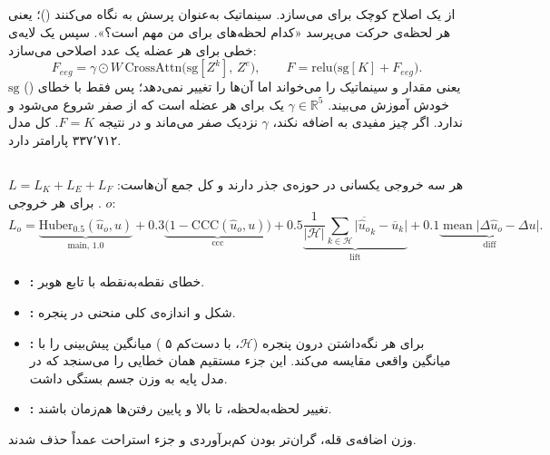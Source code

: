 \subsection{}

 از  یک اصلاح کوچک برای  می‌سازد.  سینماتیک به‌عنوان پرسش به   نگاه می‌کنند ()؛ یعنی هر لحظه‌ی حرکت می‌پرسد «کدام لحظه‌های  برای من مهم است؟». سپس یک لایه‌ی خطی برای هر عضله یک عدد اصلاحی می‌سازد:
\begin{equation}
F_{eeg}=\gamma\odot W\,\mathrm{CrossAttn}\big(\mathrm{sg}[Z^{k}],\,Z^{e}\big),\qquad F=\mathrm{relu}\big(\mathrm{sg}[K]+F_{eeg}\big).
\end{equation}
$\mathrm{sg}$ () یعنی  مقدار  و  سینماتیک را می‌خواند اما آن‌ها را تغییر نمی‌دهد؛ پس  فقط با خطای خودش آموزش می‌بیند. $\gamma\in\mathbb{R}^{5}$ یک  برای هر عضله است که از صفر شروع می‌شود و  ندارد. اگر  چیز مفیدی به  اضافه نکند، $\gamma$ نزدیک صفر می‌ماند و در نتیجه $F=K$. کل مدل ۳۳۷٬۷۱۲ پارامتر دارد.

\subsection{}

هر سه خروجی  یکسانی در حوزه‌ی جذر دارند و  کل جمع آن‌هاست: $L=L_K+L_E+L_F$. برای هر خروجی $o$:
\begin{equation}
L_o=\underbrace{\mathrm{Huber}_{0.5}(\hat u_o,u)}_{\text{main},\,1.0}
+0.3\underbrace{\big(1-\mathrm{CCC}(\hat u_o,u)\big)}_{\text{ccc}}
+0.5\underbrace{\frac{1}{|\mathcal{H}|}\sum_{k\in\mathcal{H}}\Big|\overline{\hat u_o}_{k}-\overline{u}_{k}\Big|}_{\text{lift}}
+0.1\underbrace{\operatorname{mean}\big|\Delta\hat u_o-\Delta u\big|}_{\text{diff}}.
\end{equation}
\begin{itemize}
\item \textbf{:} خطای نقطه‌به‌نقطه با تابع هوبر.
\item \textbf{:} شکل و اندازه‌ی کلی منحنی در پنجره.
\item \textbf{:} برای هر نگه‌داشتن درون پنجره ($\mathcal{H}$، با دست‌کم ۵ ) میانگین پیش‌بینی را با میانگین واقعی مقایسه می‌کند. این جزء مستقیم همان خطایی را می‌سنجد که در مدل پایه به وزن جسم بستگی داشت.
\item \textbf{:} تغییر لحظه‌به‌لحظه، تا بالا و پایین رفتن‌ها هم‌زمان باشند.
\end{itemize}
وزن اضافه‌ی قله، گران‌تر بودن کم‌برآوردی و جزء استراحت عمداً حذف شدند.

